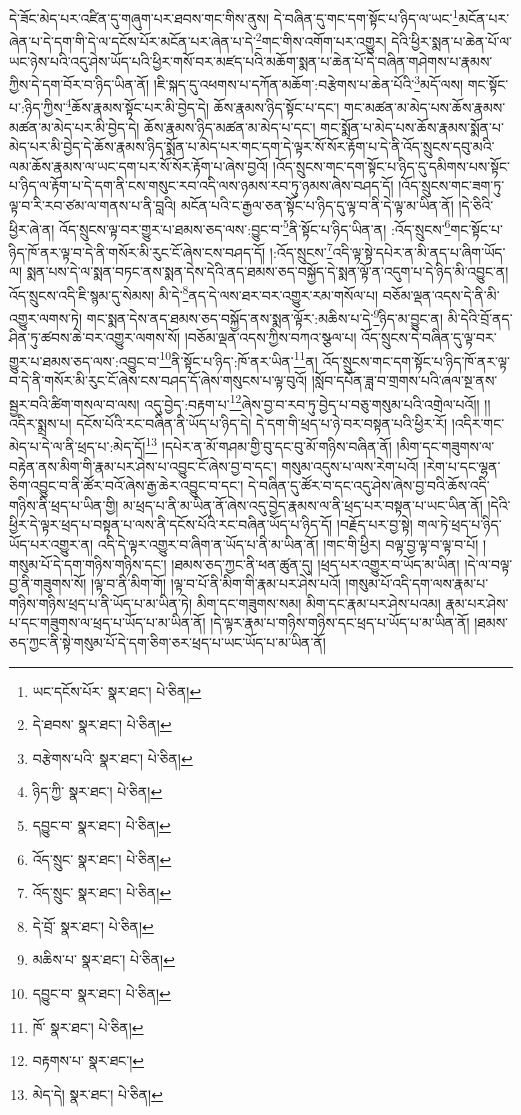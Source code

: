 དེ་ཟོང་མེད་པར་འཛིན་དུ་གཞུག་པར་ཐབས་གང་གིས་ནུས། དེ་བཞིན་དུ་གང་དག་སྟོང་པ་ཉིད་ལ་ཡང་\footnote{ཡང་དངོས་པོར་  སྣར་ཐང་།  པེ་ཅིན། }མངོན་པར་ཞེན་པ་དེ་དག་གི་དེ་ལ་དངོས་པོར་མངོན་པར་ཞེན་པ་དེ་\footnote{དེ་ཐབས་  སྣར་ཐང་།  པེ་ཅིན། }གང་གིས་འགོག་པར་འགྱུར། དེའི་ཕྱིར་སྨན་པ་ཆེན་པོ་ལ་ཡང་ཉེས་པའི་འདུ་ཤེས་ཡོད་པའི་ཕྱིར་གསོ་བར་མཛད་པའི་མཆོག་སྨན་པ་ཆེན་པོ་དེ་བཞིན་གཤེགས་པ་རྣམས་ཀྱིས་དེ་དག་བོར་བ་ཉིད་ཡིན་ནོ། །ཇི་སྐད་དུ་འཕགས་པ་དཀོན་མཆོག་:བརྩེགས་པ་ཆེན་པོའི་\footnote{བརྩེགས་པའི་  སྣར་ཐང་།  པེ་ཅིན། }མདོ་ལས། གང་སྟོང་པ་:ཉིད་ཀྱིས་\footnote{ཉིད་ཀྱི་  སྣར་ཐང་།  པེ་ཅིན། }ཆོས་རྣམས་སྟོང་པར་མི་བྱེད་དེ། ཆོས་རྣམས་ཉིད་སྟོང་པ་དང་། གང་མཚན་མ་མེད་པས་ཆོས་རྣམས་མཚན་མ་མེད་པར་མི་བྱེད་དེ། ཆོས་རྣམས་ཉིད་མཚན་མ་མེད་པ་དང་། གང་སྨོན་པ་མེད་པས་ཆོས་རྣམས་སྨོན་པ་མེད་པར་མི་བྱེད་དེ་ཆོས་རྣམས་ཉིད་སྨོན་པ་མེད་པར་གང་དག་དེ་ལྟར་སོ་སོར་རྟོག་པ་དེ་ནི་འོད་སྲུངས་དབུ་མའི་ལམ་ཆོས་རྣམས་ལ་ཡང་དག་པར་སོ་སོར་རྟོག་པ་ཞེས་བྱའོ། །འོད་སྲུངས་གང་དག་སྟོང་པ་ཉིད་དུ་དམིགས་པས་སྟོང་པ་ཉིད་ལ་རྟོག་པ་དེ་དག་ནི་ངས་གསུང་རབ་འདི་ལས་ཉམས་རབ་ཏུ་ཉམས་ཞེས་བཤད་དོ། །འོད་སྲུངས་གང་ཟག་ཏུ་ལྟ་བ་རི་རབ་ཙམ་ལ་གནས་པ་ནི་བླའི། མངོན་པའི་ང་རྒྱལ་ཅན་སྟོང་པ་ཉིད་དུ་ལྟ་བ་ནི་དེ་ལྟ་མ་ཡིན་ནོ། །དེ་ཅིའི་ཕྱིར་ཞེ་ན། འོད་སྲུངས་ལྟ་བར་གྱུར་པ་ཐམས་ཅད་ལས་:བྱུང་བ་\footnote{དབྱུང་བ་  སྣར་ཐང་།  པེ་ཅིན། }ནི་སྟོང་པ་ཉིད་ཡིན་ན། :འོད་སྲུངས་\footnote{འོད་སྲུང་  སྣར་ཐང་།  པེ་ཅིན། }གང་སྟོང་པ་ཉིད་ཁོ་ནར་ལྟ་བ་དེ་ནི་གསོར་མི་རུང་ངོ་ཞེས་ངས་བཤད་དོ། །:འོད་སྲུངས་\footnote{འོད་སྲུང་  སྣར་ཐང་།  པེ་ཅིན། }འདི་ལྟ་སྟེ་དཔེར་ན་མི་ནད་པ་ཞིག་ཡོད་ལ། སྨན་པས་དེ་ལ་སྨན་བཏང་ནས་སྨན་དེས་དེའི་ནད་ཐམས་ཅད་བསྐྱོད་དེ་སྨན་ལྟོ་ན་འདུག་པ་དེ་ཉིད་མི་འབྱུང་ན། འོད་སྲུངས་འདི་ཇི་སྙམ་དུ་སེམས། མི་དེ་\footnote{དེ་བྲོ་  སྣར་ཐང་།  པེ་ཅིན། }ནད་དེ་ལས་ཐར་བར་འགྱུར་རམ་གསོལ་པ། བཅོམ་ལྡན་འདས་དེ་ནི་མི་འགྱུར་ལགས་ཏེ། གང་སྨན་དེས་ནད་ཐམས་ཅད་བསྐྱོད་ནས་སྨན་ལྟོར་:མཆིས་པ་དེ་\footnote{མཆིས་པ་  སྣར་ཐང་།  པེ་ཅིན། }ཉིད་མ་བྱུང་ན། མི་དེའི་བྲོ་ནད་ཤིན་ཏུ་ཚབས་ཆེ་བར་འགྱུར་ལགས་སོ། །བཅོམ་ལྡན་འདས་ཀྱིས་བཀའ་སྩལ་པ། འོད་སྲུངས་དེ་བཞིན་དུ་ལྟ་བར་གྱུར་པ་ཐམས་ཅད་ལས་:འབྱུང་བ་\footnote{དབྱུང་བ་  སྣར་ཐང་།  པེ་ཅིན། }ནི་སྟོང་པ་ཉིད་:ཁོ་ནར་ཡིན་\footnote{ཁོ་  སྣར་ཐང་།  པེ་ཅིན། }ན། འོད་སྲུངས་གང་དག་སྟོང་པ་ཉིད་ཁོ་ནར་ལྟ་བ་དེ་ནི་གསོར་མི་རུང་ངོ་ཞེས་ངས་བཤད་དོ་ཞེས་གསུངས་པ་ལྟ་བུའོ། །སློབ་དཔོན་ཟླ་བ་གྲགས་པའི་ཞལ་སྔ་ནས་སྦྱར་བའི་ཚིག་གསལ་བ་ལས། འདུ་བྱེད་:བརྟག་པ་\footnote{བརྟགས་པ་  སྣར་ཐང་། }ཞེས་བྱ་བ་རབ་ཏུ་བྱེད་པ་བཅུ་གསུམ་པའི་འགྲེལ་པའོ།། །།འདིར་སྨྲས་པ། དངོས་པོའི་རང་བཞིན་ནི་ཡོད་པ་ཉིད་དེ། དེ་དག་གི་ཕྲད་པ་ཉེ་བར་བསྟན་པའི་ཕྱིར་རོ། །འདིར་གང་མེད་པ་དེ་ལ་ནི་ཕྲད་པ་:མེད་དོ།\footnote{མེད་དེ།  སྣར་ཐང་།  པེ་ཅིན། } །དཔེར་ན་མོ་གཤམ་གྱི་བུ་དང་བུ་མོ་གཉིས་བཞིན་ནོ། །མིག་དང་གཟུགས་ལ་བརྟེན་ནས་མིག་གི་རྣམ་པར་ཤེས་པ་འབྱུང་ངོ་ཞེས་བྱ་བ་དང་། གསུམ་འདུས་པ་ལས་རེག་པའོ། །རེག་པ་དང་ལྷན་ཅིག་འབྱུང་བ་ནི་ཚོར་བའོ་ཞེས་རྒྱ་ཆེར་འབྱུང་བ་དང་། དེ་བཞིན་དུ་ཚོར་བ་དང་འདུ་ཤེས་ཞེས་བྱ་བའི་ཆོས་འདི་གཉིས་ནི་ཕྲད་པ་ཡིན་གྱི། མ་ཕྲད་པ་ནི་མ་ཡིན་ནོ་ཞེས་འདུ་བྱེད་རྣམས་ལ་ནི་ཕྲད་པར་བསྟན་པ་ཡང་ཡིན་ནོ། །དེའི་ཕྱིར་དེ་ལྟར་ཕྲད་པ་བསྟན་པ་ལས་ནི་དངོས་པོའི་རང་བཞིན་ཡོད་པ་ཉིད་དོ། །བརྗོད་པར་བྱ་སྟེ། གལ་ཏེ་ཕྲད་པ་ཉིད་ཡོད་པར་འགྱུར་ན། འདི་དེ་ལྟར་འགྱུར་བ་ཞིག་ན་ཡོད་པ་ནི་མ་ཡིན་ནོ། །གང་གི་ཕྱིར། བལྟ་བྱ་ལྟ་བ་ལྟ་བ་པོ། །གསུམ་པོ་དེ་དག་གཉིས་གཉིས་དང་། །ཐམས་ཅད་ཀྱང་ནི་ཕན་ཚུན་དུ། །ཕྲད་པར་འགྱུར་བ་ཡོད་མ་ཡིན། །དེ་ལ་བལྟ་བྱ་ནི་གཟུགས་སོ། །ལྟ་བ་ནི་མིག་གོ། །ལྟ་བ་པོ་ནི་མིག་གི་རྣམ་པར་ཤེས་པའོ། །གསུམ་པོ་འདི་དག་ལས་རྣམ་པ་གཉིས་གཉིས་ཕྲད་པ་ནི་ཡོད་པ་མ་ཡིན་ཏེ། མིག་དང་གཟུགས་སམ། མིག་དང་རྣམ་པར་ཤེས་པའམ། རྣམ་པར་ཤེས་པ་དང་གཟུགས་ལ་ཕྲད་པ་ཡོད་པ་མ་ཡིན་ནོ། །དེ་ལྟར་རྣམ་པ་གཉིས་གཉིས་དང་ཕྲད་པ་ཡོད་པ་མ་ཡིན་ནོ། །ཐམས་ཅད་ཀྱང་ནི་སྟེ་གསུམ་པོ་དེ་དག་ཅིག་ཅར་ཕྲད་པ་ཡང་ཡོད་པ་མ་ཡིན་ནོ། 